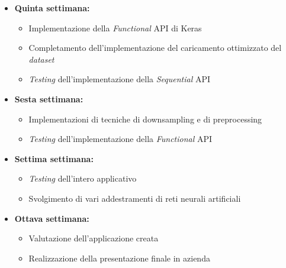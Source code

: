 \begin{itemize}
    \newpage

    \item \textbf{Quinta settimana:}
        \begin{itemize}
            \item Implementazione della \textit{Functional} API di Keras
            \item Completamento dell'implementazione del caricamento ottimizzato del \textit{dataset}
            \item \textit{Testing} dell'implementazione della \textit{Sequential} API
        \end{itemize}
    \item \textbf{Sesta settimana:}
        \begin{itemize}
            \item Implementazioni di tecniche di \gls{downsampling} e di \gls{preprocessing}
            \item \textit{Testing} dell'implementazione della \textit{Functional} API
        \end{itemize}
    \item \textbf{Settima settimana:}
        \begin{itemize}
            \item \textit{Testing} dell'intero applicativo
            \item Svolgimento di vari addestramenti di reti neurali artificiali
        \end{itemize}
    \item \textbf{Ottava settimana:}
        \begin{itemize}
            \item Valutazione dell'applicazione creata
            \item Realizzazione della presentazione finale in azienda
        \end{itemize}
\end{itemize}

